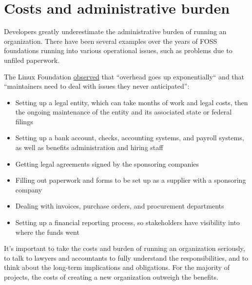 


\chapter{Costs and administrative burden}

Developers greatly underestimate the administrative burden of running an organization.  There have been several examples over the years of FOSS foundations running into various operational issues, such as problems due to unfiled paperwork.

The Linux Foundation \href{https://www.linuxfoundation.org/blog/the-linux-foundation-its-not-just-the-linux-operating-system/}{observed} that ``overhead goes up exponentially`` and that ``maintainers need to deal with issues they never anticipated'':

\begin{itemize}

\item Setting up a legal entity, which can take months of work and legal costs, then the ongoing maintenance of the entity and its associated state or federal filings

\item Setting up a bank account, checks, accounting systems, and payroll systems, as well as benefits administration and hiring staff

\item Getting legal agreements signed by the sponsoring companies

\item Filling out paperwork and forms to be set up as a supplier with a sponsoring company

\item Dealing with invoices, purchase orders, and procurement departments

\item Setting up a financial reporting process, so stakeholders have visibility into where the funds went

\end{itemize}

It's important to take the costs and burden of running an organization seriously, to talk to lawyers and accountants to fully understand the responsibilities, and to think about the long-term implications and obligations.  For the majority of projects, the costs of creating a new organization outweigh the benefits.

